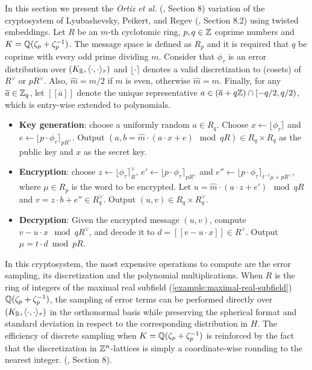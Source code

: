 \documentclass[a4paper,12pt]{article}
\begin{document}
   \begin{text}
  In this section we present the \textit{Ortiz et al.} (\cite{Ortiz2021}, Section 8)
  variation of the cryptosystem of Lyubashevsky, Peikert, and Regev
  (\cite{LPV2013}, Section 8.2) using twisted embeddings. Let $R$ be an $m$-th
  cyclotomic ring, $p, q \in \mathbb{Z}$ coprime numbers and $K = \mathbb{Q}(\zeta_p + \zeta_p^{-1})$. The message space is defined as
  $R_p$ and it is required that $q$ be coprime with every odd prime dividing
  $m$. Consider that $\phi_\tau$ is an error distribution over $(K_{\mathbb{R}},\langle{\cdot,\cdot}\rangle_\tau)$
  and $\lfloor{\cdot}\rceil$ denotes a valid discretization to (cosets) of $R^\vee$ or $pR^\vee$.
  Also, $\hat{m} = m/2$ if $m$ is even, otherwise $\hat{m} = m$. Finally, for any
  $\overline{a} \in \mathbb{Z}_q$, let $[[\overline{a}]]$ denote the unique representative
  $a \in (\overline{a} + q\mathbb{Z}) \cap [-q/2, q/2)$, which is entry-wise extended to
  polynomials.

  \begin{itemize}
  \item \textbf{Key generation}: choose a uniformly random $a \in R_q$. Choose $x
    \longleftarrow \lfloor{\phi_\tau}\rceil$ and $e \longleftarrow \lfloor{p \cdot \phi_\tau}\rceil_{pR^\vee}$. Output $(a,b = \hat{m}\cdot(a \cdot x + e)
    \mod{qR} ) \in R_q \times R_q$ as the public key and $x$ as the secret key.
  \item \textbf{Encryption}: choose $z \longleftarrow  \lfloor{\phi_\tau}\rceil_R^\vee$, $e' \longleftarrow \lfloor{p \cdot
      \phi_\tau}\rceil_{pR^\vee}$ and  $e'' \longleftarrow \lfloor{p \cdot \phi_\tau}\rceil_{t^{-1}\mu +pR^\vee}$, where $\mu \in R_p$ is
    the word to be encrypted. Let $u = \hat{m} \cdot (a \cdot z + e') \mod{qR}$ and $v =
    z \cdot b + e'' \in R_q^\vee$. Output $(u,v) \in R_q \times R^\vee_q$.
  \item \textbf{Decryption}: Given the encrypted message $(u,v)$, compute $v - u
    \cdot x \mod{qR^\vee}$, and decode it to $d = [[v - u \cdot x]] \in R^\vee$. Output $\mu = t \cdot
    d \bmod{pR}$. 
  \end{itemize}

  In this cryptosystem, the most expensive operations to compute are the error sampling, its discretization and the polynomial multiplications. When $R$ is
  the ring of integers of the maximal real subfield
  (\ref{example:maximal-real-subfield}) $\mathbb{Q}(\zeta_{p} + \zeta_{p} ^{-1})$, the sampling of error terms can be performed directly over $(K_{\mathbb{R}}, \langle{\cdot,\cdot}\rangle_\tau)$ in the orthonormal basis while preserving the spherical format and standard deviation in respect to the corresponding distribution in $H$. The efficiency
of discrete sampling when $K = \mathbb{Q}(\zeta_p + \zeta_p^{-1})$ is reinforced by the fact
that the discretization in $\mathbb{Z}^n$-lattices is simply a coordinate-wise rounding to the nearest integer. (\cite{Ortiz2021}, Section 8).
\end{text}
\end{document}
